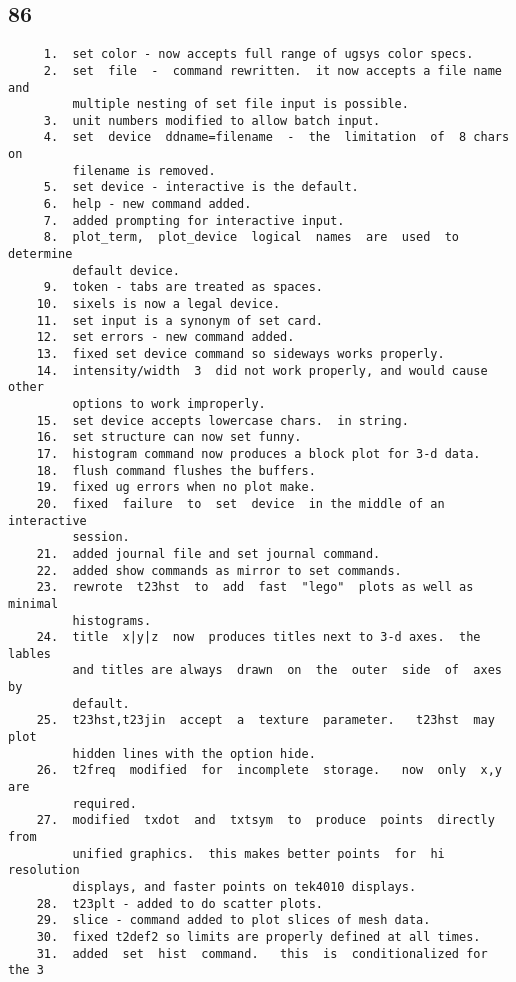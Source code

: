 \subsection{86}
\begin{verbatim}
     1.  set color - now accepts full range of ugsys color specs.  
     2.  set  file  -  command rewritten.  it now accepts a file name and
         multiple nesting of set file input is possible.  
     3.  unit numbers modified to allow batch input.  
     4.  set  device  ddname=filename  -  the  limitation  of  8 chars on
         filename is removed.  
     5.  set device - interactive is the default.  
     6.  help - new command added.  
     7.  added prompting for interactive input.  
     8.  plot_term,  plot_device  logical  names  are  used  to determine
         default device.  
     9.  token - tabs are treated as spaces.  
    10.  sixels is now a legal device.  
    11.  set input is a synonym of set card.  
    12.  set errors - new command added.  
    13.  fixed set device command so sideways works properly.  
    14.  intensity/width  3  did not work properly, and would cause other
         options to work improperly.  
    15.  set device accepts lowercase chars.  in string.  
    16.  set structure can now set funny.  
    17.  histogram command now produces a block plot for 3-d data.  
    18.  flush command flushes the buffers.  
    19.  fixed ug errors when no plot make.  
    20.  fixed  failure  to  set  device  in the middle of an interactive
         session.  
    21.  added journal file and set journal command.  
    22.  added show commands as mirror to set commands.  
    23.  rewrote  t23hst  to  add  fast  "lego"  plots as well as minimal
         histograms.  
    24.  title  x|y|z  now  produces titles next to 3-d axes.  the lables
         and titles are always  drawn  on  the  outer  side  of  axes  by
         default.  
    25.  t23hst,t23jin  accept  a  texture  parameter.   t23hst  may plot
         hidden lines with the option hide.  
    26.  t2freq  modified  for  incomplete  storage.   now  only  x,y are
         required.  
    27.  modified  txdot  and  txtsym  to  produce  points  directly from
         unified graphics.  this makes better points  for  hi  resolution
         displays, and faster points on tek4010 displays.  
    28.  t23plt - added to do scatter plots.  
    29.  slice - command added to plot slices of mesh data.  
    30.  fixed t2def2 so limits are properly defined at all times.  
    31.  added  set  hist  command.   this  is  conditionalized for the 3

\end{verbatim}
